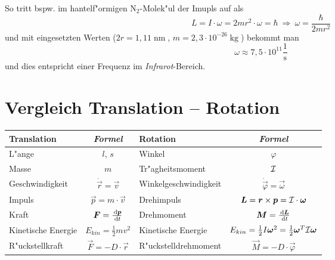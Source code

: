 So tritt bspw. im hantelf"ormigen $\operatorname{N_2}$-Molek"ul der
Imupls auf als
$$
L = I \cdot \omega = 2mr^2 \cdot \omega = \hbar ~ \Rightarrow ~ \omega
= \frac{\hbar}{2mr^2}
$$
und mit eingesetzten Werten ($2r = 1,11 \operatorname{nm}$, $m = 2,3
\cdot 10^{-26}\operatorname{kg}$) bekommt man
$$
\omega \approx 7,5 \cdot 10^{11} \frac{1}{\operatorname{s}}
$$
und dies entspricht einer Frequenz im \emph{Infrarot}-Bereich.









\section{Vergleich Translation -- Rotation}
\label{kap_vergleich-translation-rotation}

\begin{center}

   \begin{tabular}{l c  l c}
      \toprule
      \textbf{Translation} &  \textit{Formel} & \textbf{Rotation} &
      \textit{Formel} \\
      \midrule
      L"ange & $l$, $s$ & Winkel & $\varphi$ \\
      Masse & $m$ & Tr"agheitsmoment & ${\mathcal{I}}$ \\
      Geschwindigkeit & $\dot{\vec r} = \vec v$ &
      Winkelgeschwindigkeit & $\dot{\vec \varphi} = \vec \omega$ \\
      Impuls & $\vec p = m \cdot \vec v$ & Drehimpuls & $\boldsymbol{L} = \boldsymbol{r}
      \times \boldsymbol{p} = {\mathcal{I}} \cdot \boldsymbol{\omega}$ \\
      Kraft & $\boldsymbol{F} = \frac{\, \mathrm{d} \boldsymbol{p}}{\, \mathrm{d} t }$ & Drehmoment & $\boldsymbol{M} =
      \frac{\, \mathrm{d} \boldsymbol{L}}{\, \mathrm{d} t}$ \\
      Kinetische Energie & $E_{kin} = \frac{1}{2}mv^2$ & Kinetische Energie
      & $E_{kin} = \frac{1}{2} I \boldsymbol{\omega}^2 = \frac{1}{2} \boldsymbol{\omega}^T {\mathcal{I}} \boldsymbol{\omega}$ \\
      R"uckstellkraft & $\vec F = -D \cdot \vec r$ & R"uckstelldrehmoment &
      $\vec M = -D \cdot \vec \varphi$ \\
      \bottomrule
   \end{tabular}
\end{center}




























